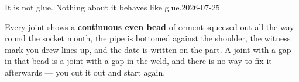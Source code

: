 


  {It is not glue. Nothing about it behaves like glue.}{2026-07-25}



\begin{standard}
Every joint shows a \textbf{continuous even bead} of cement squeezed out all the
way round the socket mouth, the pipe is bottomed against the shoulder, the
witness mark you drew lines up, and the date is written on the part. A joint
with a gap in that bead is a joint with a gap in the weld, and there is no way
to fix it afterwards --- you cut it out and start again.
\end{standard}

